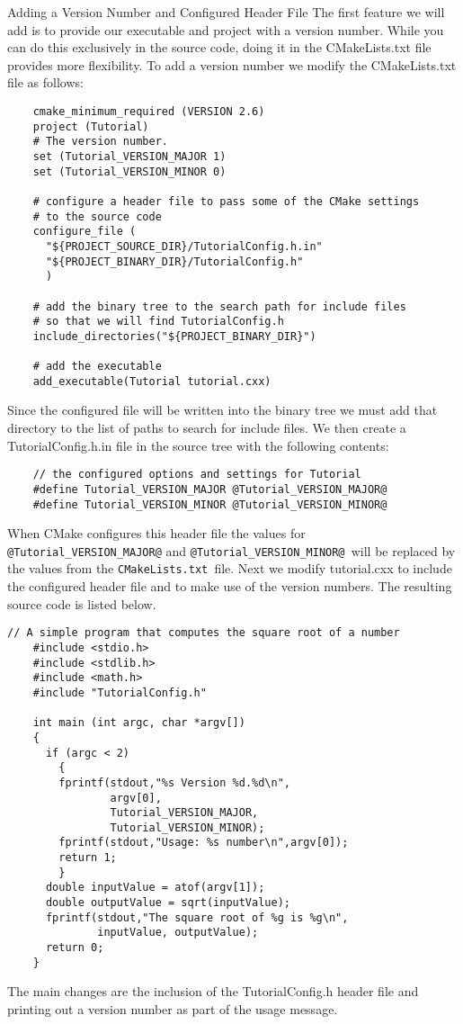 \documentclass[UTF8,a4paper,8pt]{ctexart}
\begin{document}
	Adding a Version Number and Configured Header File
	The first feature we will add is to provide our executable and project with a version number. While you can do this exclusively in the source code, doing it in the CMakeLists.txt file provides more flexibility. To add a version number we modify the CMakeLists.txt file as follows:
	\begin{lstlisting}
    cmake_minimum_required (VERSION 2.6)
	project (Tutorial)
	# The version number.
	set (Tutorial_VERSION_MAJOR 1)
	set (Tutorial_VERSION_MINOR 0)
	 
	# configure a header file to pass some of the CMake settings
	# to the source code
	configure_file (
	  "${PROJECT_SOURCE_DIR}/TutorialConfig.h.in"
	  "${PROJECT_BINARY_DIR}/TutorialConfig.h"
	  )
	 
	# add the binary tree to the search path for include files
	# so that we will find TutorialConfig.h
	include_directories("${PROJECT_BINARY_DIR}")
	 
	# add the executable
	add_executable(Tutorial tutorial.cxx)	
	\end{lstlisting} 
	
	Since the configured file will be written into the binary tree we must add that directory to the list of paths to search for include files. We then create a TutorialConfig.h.in file in the source tree with the following contents:
	\begin{lstlisting}	
	// the configured options and settings for Tutorial
	#define Tutorial_VERSION_MAJOR @Tutorial_VERSION_MAJOR@
	#define Tutorial_VERSION_MINOR @Tutorial_VERSION_MINOR@
	\end{lstlisting} 	 
	
	When CMake configures this header file the values for \verb|@Tutorial_VERSION_MAJOR@| and \verb|@Tutorial_VERSION_MINOR@ |will be replaced by the values from the \verb|CMakeLists.txt |file. Next we modify tutorial.cxx to include the configured header file and to make use of the version numbers. The resulting source code is listed below.
	
	\begin{lstlisting}[frame = lines]	
	// A simple program that computes the square root of a number
	#include <stdio.h>
	#include <stdlib.h>
	#include <math.h>
	#include "TutorialConfig.h"
	 
	int main (int argc, char *argv[])
	{
	  if (argc < 2)
	    {
	    fprintf(stdout,"%s Version %d.%d\n",
	            argv[0],
	            Tutorial_VERSION_MAJOR,
	            Tutorial_VERSION_MINOR);
	    fprintf(stdout,"Usage: %s number\n",argv[0]);
	    return 1;
	    }
	  double inputValue = atof(argv[1]);
	  double outputValue = sqrt(inputValue);
	  fprintf(stdout,"The square root of %g is %g\n",
	          inputValue, outputValue);
	  return 0;
	}
	\end{lstlisting} 
	The main changes are the inclusion of the TutorialConfig.h header file and printing out a version number as part of the usage message.
	
\end{document}
